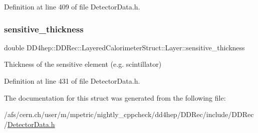 Definition at line 409 of file Detector\+Data.\+h.

\hypertarget{struct_d_d4hep_1_1_d_d_rec_1_1_layered_calorimeter_struct_1_1_layer_af1137d1b807db356fee6095e24aa5cea}{}\label{struct_d_d4hep_1_1_d_d_rec_1_1_layered_calorimeter_struct_1_1_layer_af1137d1b807db356fee6095e24aa5cea} 
\subsubsection{\texorpdfstring{sensitive\+\_\+thickness}{sensitive\_thickness}}
{\footnotesize\ttfamily double D\+D4hep\+::\+D\+D\+Rec\+::\+Layered\+Calorimeter\+Struct\+::\+Layer\+::sensitive\+\_\+thickness}



Thickness of the sensitive element (e.\+g. scintillator) 



Definition at line 431 of file Detector\+Data.\+h.



The documentation for this struct was generated from the following file\+:\begin{DoxyCompactItemize}
\item 
/afs/cern.\+ch/user/m/mpetric/nightly\+\_\+cppcheck/dd4hep/\+D\+D\+Rec/include/\+D\+D\+Rec/\hyperlink{_detector_data_8h}{Detector\+Data.\+h}\end{DoxyCompactItemize}
